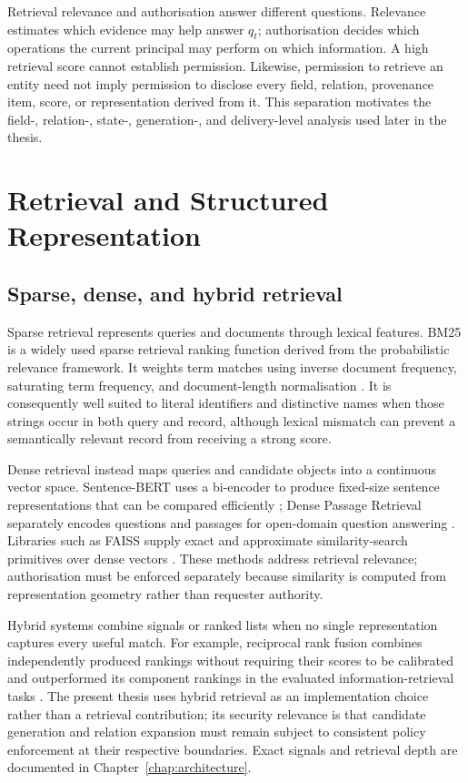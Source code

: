 Retrieval relevance and authorisation answer different questions. Relevance estimates which evidence may help answer $q_t$; authorisation decides which operations the current principal may perform on which information. A high retrieval score cannot establish permission. Likewise, permission to retrieve an entity need not imply permission to disclose every field, relation, provenance item, score, or representation derived from it. This separation motivates the field-, relation-, state-, generation-, and delivery-level analysis used later in the thesis.

\section{Retrieval and Structured Representation}
\label{sec:background-structured-retrieval}

\subsection{Sparse, dense, and hybrid retrieval}

Sparse retrieval represents queries and documents through lexical features. BM25 is a widely used sparse retrieval ranking function derived from the probabilistic relevance framework. It weights term matches using inverse document frequency, saturating term frequency, and document-length normalisation \citep{robertson2009bm25}. It is consequently well suited to literal identifiers and distinctive names when those strings occur in both query and record, although lexical mismatch can prevent a semantically relevant record from receiving a strong score.

Dense retrieval instead maps queries and candidate objects into a continuous vector space. Sentence-BERT uses a bi-encoder to produce fixed-size sentence representations that can be compared efficiently \citep{reimers2019sentencebert}; Dense Passage Retrieval separately encodes questions and passages for open-domain question answering \citep{karpukhin2020dpr}. Libraries such as FAISS supply exact and approximate similarity-search primitives over dense vectors \citep{johnson2019faiss}. These methods address retrieval relevance; authorisation must be enforced separately because similarity is computed from representation geometry rather than requester authority.

Hybrid systems combine signals or ranked lists when no single representation captures every useful match. For example, reciprocal rank fusion combines independently produced rankings without requiring their scores to be calibrated and outperformed its component rankings in the evaluated information-retrieval tasks \citep{cormack2009rrf}. The present thesis uses hybrid retrieval as an implementation choice rather than a retrieval contribution; its security relevance is that candidate generation and relation expansion must remain subject to consistent policy enforcement at their respective boundaries. Exact signals and retrieval depth are documented in Chapter~\ref{chap:architecture}.

